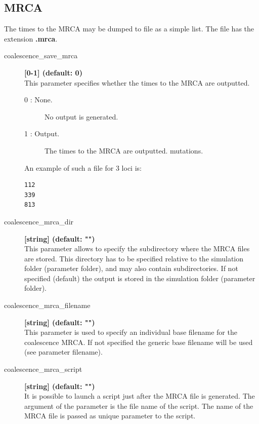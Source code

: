 \documentclass[letterpaper,12pt,oneside]{book}
\begin{document}
\subsection{MRCA}\label{coalMRCA}
The times to the MRCA may be dumped to file as a simple list. The file has the extension \textbf{.mrca}.

\begin{description} 
\item[coalescence\_save\_mrca] \textbf{[0-1] (default: 0)} \\
This parameter specifies whether the times to the MRCA are outputted.
\begin{description}
\item [0 : None.] No output is generated.
\item [1 : Output.] The times to the MRCA are outputted.
mutations.
\end{description} 

An example of such a file for 3 loci is:
\begin{lstlisting}[frame=single]
112
339
813
\end{lstlisting}

\item[coalescence\_mrca\_dir] \textbf{[string] (default: "")}\\
This parameter allows to specify the subdirectory where the MRCA files are stored. This directory has to be specified relative to the simulation folder (parameter \textsf{folder}), and may also contain subdirectories. If not specified (default) the output is stored in the simulation folder (parameter \textsf{folder}).

\item[coalescence\_mrca\_filename] \textbf{[string] (default: "")}\\
This parameter is used to specify an individual base filename for the coalescence MRCA. If not specified the generic base filename will be used (see parameter \textsf{filename}).

\item[coalescence\_mrca\_script] \textbf{[string] (default: "")}\\
It is possible to launch a script just after the MRCA file is generated. The argument of the parameter is the file name of the script. The name of the MRCA file is passed as unique parameter to the script. 
\end{description}
\end{document}
